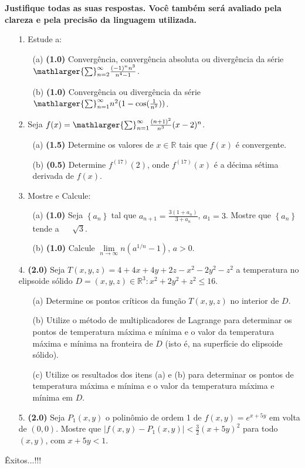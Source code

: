 \documentclass[oneside,a4paper,12pt]{article}
\begin{document}
	\vspace{10pt}
	\textbf{Justifique todas as suas respostas. Você também será avaliado pela clareza e pela precisão da linguagem utilizada.}
\begin{itemize}
\item[1.] Estude a:
	\begin{itemize}
	\item[(a)]\textbf{(1.0)} Convergência, convergência absoluta ou divergência da série $\mathlarger{\sum}_{n=2}^{\infty}\frac{(-1)^{n}n^{3}}{n^{4}-1}$.
	\item[(b)]\textbf{(1.0)} Convergência ou divergência da série $\mathlarger{\sum}_{n=1}^{\infty} n^{2}(1-\cos(\frac{1}{n^{2}})) $.
	\end{itemize}
\end{itemize}
\begin{itemize}
\item[2.] Seja $f(x)=\mathlarger{\sum}_{n=1}^{\infty}\frac{(n+1)^{2}}{n^{3}}(x-2)^{n}$.
	\begin{itemize} 
	\item[(a)]\textbf{(1.5)} Determine os valores de $x\in\mathbb{R}$ tais que $f(x)$ é convergente.
	\item[(b)]\textbf{(0.5)} Determine $f^{(17)}(2)$, onde $f^{(17)}(x)$ é a décima sétima derivada de $f(x)$.
    \end{itemize}
 \end{itemize}
 \begin{itemize}
\item [3.] Mostre e Calcule:
	\begin{itemize}
	\item[(a)]\textbf{(1.0)} Seja $\left\lbrace a_{n}\right\rbrace $ tal que $a_{n+1}=\frac{3(1+a_{n})}{3+a_{n}}$, $a_{1}=3$. Mostre que $\left\lbrace a_{n}\right\rbrace $ tende a $\quad\sqrt[]{3}$.
	\item[(b)]\textbf{(1.0)} Calcule $\lim\limits_{n\longrightarrow \infty} n(a^{1/n}-1)$, $a>0$.
    \end{itemize}
\end{itemize}
\begin{itemize}
\item[4.]\textbf{(2.0)} Seja $T(x,y,z)=4+4x+4y+2z-x^{2}-2y^{2}-z^{2}$ a temperatura no elipsoide sólido $D={(x,y,z)\in\mathbb{R}^{3}: x^{2}+2y^{2}+z^{2}\leq 16}$.
\begin{itemize} 
	\item[(a)] Determine os pontos críticos da função $T(x,y,z)$ no interior de $D$.
	\item[(b)] Utilize o método de multiplicadores de Lagrange para determinar os pontos de temperatura máxima e mínima e o valor da temperatura máxima e mínima na fronteira de $D$ (isto é, na superfície do elipsoide sólido).
	\item[(c)] Utilize os resultados dos itens (a) e (b) para determinar os pontos de temperatura máxima e mínima e o valor da temperatura máxima e mínima em $D$.
\end{itemize}
\end{itemize}
\begin{itemize} 
	\item[5.] \textbf{(2.0)} Seja $P_{1}(x,y)$ o polinômio de ordem 1 de $f(x,y)=e^{x+5y}$ em volta de $(0,0)$. Mostre que $\left| f(x,y)-P_{1}(x,y) \right|<\frac{3}{2}\left(x+5y\right)^{2} $ para todo $(x,y)$, com $x+5y<1$.
\end{itemize} 
	\flushbottom
	\flushright
     Êxitos...!!!
\end{document}

